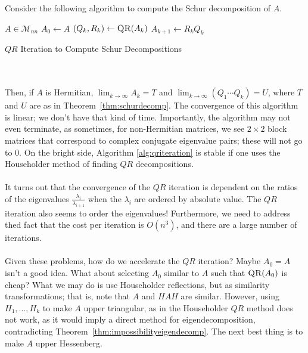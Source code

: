         Consider the following algorithm to compute the Schur decomposition of \(A\).
        \begin{algorithm}[H]
            \begin{algorithmic}[1]
                \Require \(A\in\mathcal{M}_{nn}\) 
                    \State \(A_0\gets A\)
                        \State \((Q_k,R_k)\gets \Call{QR}{A_k}\)
                        \State \(A_{k+1}\gets R_kQ_k\) 
                    \EndWhile
                \EndProcedure 
            \end{algorithmic}
            \caption{\(QR\) Iteration to Compute Schur Decompositions}
            \label{alg:qriteration}
        \end{algorithm}
        \vphantom
        \\
        \\
        Then, if \(A\) is Hermitian, \(\lim_{k\to\infty}A_k=T\) and \(\lim_{k\to\infty}(Q_1\cdots Q_k)=U\), where \(T\) and \(U\) are as in Theorem~\ref{thm:schurdecomp}. The convergence of this algorithm is linear; we don't have that kind of time. Importantly, the algorithm may not even terminate, as sometimes, for non-Hermitian matrices, we see \(2\times 2\) block matrices that correspond to complex conjugate eigenvalue pairs; these will not go to \(0\). On the bright side, Algorithm \ref{alg:qriteration} is stable if one uses the Householder method of finding \(QR\) decompositions.
        \\
        \\
        It turns out that the convergence of the \(QR\) iteration is dependent on the ratios of the eigenvalues \(\frac{\lambda_i}{\lambda_{i+1}}\) when the \(\lambda_i\) are ordered by absolute value. The \(QR\) iteration also seems to order the eigenvalues! Furthermore, we need to address thed fact that the cost per iteration is \(O(n^3)\), and there are a large number of iterations.
        \\
        \\
        Given these problems, how do we accelerate the \(QR\) iteration? Maybe \(A_0=A\) isn't a good idea. What about selecting \(A_0\) similar to \(A\) such that \(\textsc{QR}(A_0)\) is cheap? What we may do is use Householder reflections, but as similarity transformations; that is, note that \(A\) and \(HAH\) are similar. However, using \(H_1,\ldots,H_k\) to make \(A\) upper triangular, as in the Householder \(QR\) method does not work, as it would imply a direct method for eigendecomposition, contradicting Theorem~\ref{thm:impossibilityeigendecomp}. The next best thing is to make \(A\) upper Hessenberg.
